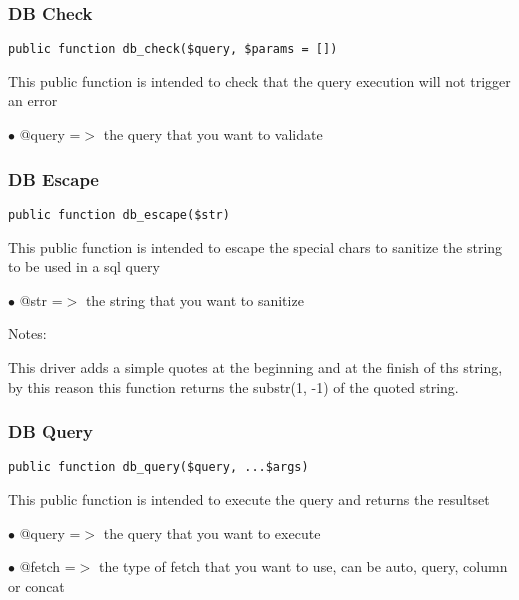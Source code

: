 \documentclass[a4paper]{article}
\begin{document}
\hypertarget{toc348}{}
\subsubsection{DB Check}

\begin{lstlisting}
public function db_check($query, $params = [])
\end{lstlisting}

This public function is intended to check that the query execution will not trigger an error

\begin{compactitem}
\item[\color{myblue}$\bullet$] @query =$>$ the query that you want to validate
\end{compactitem}

\hypertarget{toc349}{}
\subsubsection{DB Escape}

\begin{lstlisting}
public function db_escape($str)
\end{lstlisting}

This public function is intended to escape the special chars to sanitize the string to be used
in a sql query

\begin{compactitem}
\item[\color{myblue}$\bullet$] @str =$>$ the string that you want to sanitize
\end{compactitem}

Notes:

This driver adds a simple quotes at the beginning and at the finish of ths string, by this
reason this function returns the substr(1, -1) of the quoted string.

\hypertarget{toc350}{}
\subsubsection{DB Query}

\begin{lstlisting}
public function db_query($query, ...$args)
\end{lstlisting}

This public function is intended to execute the query and returns the resultset

\begin{compactitem}
\item[\color{myblue}$\bullet$] @query =$>$ the query that you want to execute
\item[\color{myblue}$\bullet$] @fetch =$>$ the type of fetch that you want to use, can be auto, query, column or concat
\end{compactitem}
\end{document}
